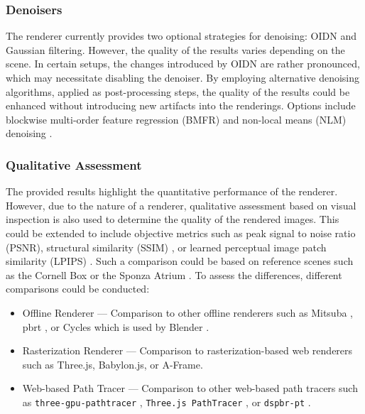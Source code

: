 \subsubsection*{Denoisers}

The renderer currently provides two optional strategies for denoising: \gls{OIDN} \cite{openImageDenoise} and Gaussian filtering. However, the quality of the results varies depending on the scene. In certain setups, the changes introduced by \gls{OIDN} are rather pronounced, which may necessitate disabling the denoiser. By employing alternative denoising algorithms, applied as post-processing steps, the quality of the results could be enhanced without introducing new artifacts into the renderings. Options include blockwise multi-order feature regression (BMFR) \cite{blockwise-multi-order-regresssion-for-rt-pt} and non-local means (NLM) denoising \cite{buadesNLMDenoising}.

\subsubsection*{Qualitative Assessment}

The provided results highlight the quantitative performance of the renderer. However, due to the nature of a renderer, qualitative assessment based on visual inspection is also used to determine the quality of the rendered images. This could be extended to include objective metrics such as peak signal to noise ratio (PSNR), structural similarity (SSIM) \cite{ssim}, or learned perceptual image patch similarity (LPIPS) \cite{lpips}. Such a comparison could be based on reference scenes such as the Cornell Box \cite{goral1984modeling} or the Sponza Atrium \cite{dabrovic2002sponza}. To assess the differences, different comparisons could be conducted:

\begin{itemize}
  \item{Offline Renderer} — Comparison to other offline renderers such as Mitsuba \cite{Jakob2020DrJit}, \gls{pbrt} \cite{Pharr_Physically_Based_Rendering_2023}, or Cycles which is used by \gls{Blender} \cite{cycles}.
  \item{Rasterization Renderer} — Comparison to rasterization-based web renderers such as \gls{Three.js}, \gls{Babylon.js}, or \gls{A-Frame}.
  \item{Web-based Path Tracer} — Comparison to other web-based path tracers such as \texttt{three-gpu-pathtracer} \cite{ThreeJsPathTracerJohnson}, \texttt{Three.js PathTracer} \cite{ThreeJsPathTracerLoftis}, or \texttt{dspbr-pt} \cite{PathTracerDassault}.
\end{itemize}

